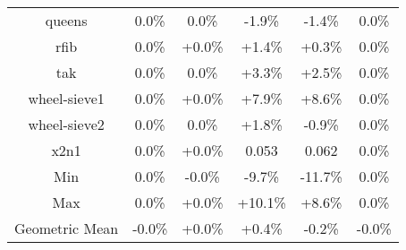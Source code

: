 \begin{tabular}{ c c c c c c }
queens &  0.0\% &  0.0\% & -1.9\% & -1.4\% &  0.0\%\\
rfib &  0.0\% & +0.0\% & +1.4\% & +0.3\% &  0.0\%\\
tak &  0.0\% &  0.0\% & +3.3\% & +2.5\% &  0.0\%\\
wheel-sieve1 &  0.0\% & +0.0\% & +7.9\% & +8.6\% &  0.0\%\\
wheel-sieve2 &  0.0\% &  0.0\% & +1.8\% & -0.9\% &  0.0\%\\
x2n1 &  0.0\% & +0.0\% & 0.053 & 0.062 &  0.0\%\\
\hline
Min &  0.0\% & -0.0\% & -9.7\% & -11.7\% &  0.0\%\\
Max &  0.0\% & +0.0\% & +10.1\% & +8.6\% &  0.0\%\\
Geometric Mean & -0.0\% & +0.0\% & +0.4\% & -0.2\% & -0.0\%\\


\end{tabular}
